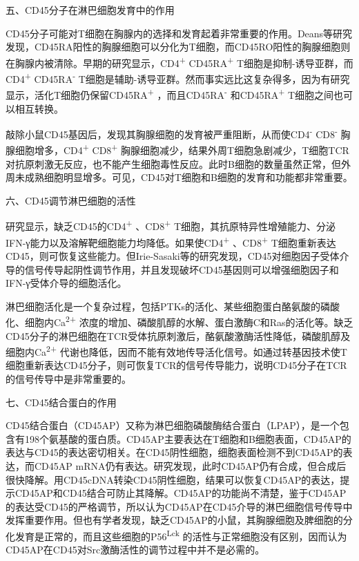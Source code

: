 \begin{center}
 {\large 五、CD45分子在淋巴细胞发育中的作用}
 \end{center}

CD45分子可能对T细胞在胸腺内的选择和发育起着非常重要的作用。Deans等研究发现，CD45RA阳性的胸腺细胞可以分化为T细胞，而CD45RO阳性的胸腺细胞则在胸腺内被清除。早期的研究显示，CD4\textsuperscript{+}
CD45RA\textsuperscript{+} T细胞是抑制-诱导亚群，而CD4\textsuperscript{+}
CD45RA\textsuperscript{-}
T细胞是辅助-诱导亚群。然而事实远比这复杂得多，因为有研究显示，活化T细胞仍保留CD45RA\textsuperscript{+}
，而且CD45RA\textsuperscript{-} 和CD45RA\textsuperscript{+}
T细胞之间也可以相互转换。

敲除小鼠CD45基因后，发现其胸腺细胞的发育被严重阻断，从而使CD4\textsuperscript{-}
CD8\textsuperscript{-} 胸腺细胞增多，CD4\textsuperscript{+}
CD8\textsuperscript{+}
胸腺细胞减少，结果外周T细胞急剧减少，T细胞TCR对抗原刺激无反应，也不能产生细胞毒性反应。此时B细胞的数量虽然正常，但外周未成熟细胞明显增多。可见，CD45对T细胞和B细胞的发育和功能都非常重要。

\begin{center}
 {\large 六、CD45调节淋巴细胞的活性}
 \end{center}

研究显示，缺乏CD45的CD4\textsuperscript{+} 、CD8\textsuperscript{+}
T细胞，其抗原特异性增殖能力、分泌IFN-γ能力以及溶解靶细胞能力均降低。如果使CD4\textsuperscript{+}
、CD8\textsuperscript{+}
T细胞重新表达CD45，则可恢复这些能力。但Irie-Sasaki等的研究发现，CD45对细胞因子受体介导的信号传导起阴性调节作用，并且发现破坏CD45基因则可以增强细胞因子和IFN-γ受体介导的细胞活化。

淋巴细胞活化是一个复杂过程，包括PTKs的活化、某些细胞蛋白酪氨酸的磷酸化、细胞内Ca\textsuperscript{2+}
浓度的增加、磷酸肌醇的水解、蛋白激酶C和Ras的活化等。缺乏CD45分子的淋巴细胞在TCR受体抗原刺激后，酪氨酸激酶活性降低，磷酸肌醇及细胞内Ca\textsuperscript{2+}
代谢也降低，因而不能有效地传导活化信号。如通过转基因技术使T细胞重新表达CD45分子，则可恢复TCR的信号传导能力，说明CD45分子在TCR的信号传导中是非常重要的。

\begin{center}
 {\large 七、CD45结合蛋白的作用}
 \end{center}

CD45结合蛋白（CD45AP）又称为淋巴细胞磷酸酶结合蛋白（LPAP），是一个包含有198个氨基酸的蛋白质。CD45AP主要表达在T细胞和B细胞表面，CD45AP的表达与CD45的表达密切相关。在CD45阴性细胞，细胞表面检测不到CD45AP的表达，而CD45AP
mRNA仍有表达。研究发现，此时CD45AP仍有合成，但合成后很快降解。用CD45cDNA转染CD45阴性细胞，结果可以恢复CD45AP的表达，提示CD45AP和CD45结合可防止其降解。CD45AP的功能尚不清楚，鉴于CD45AP的表达受CD45的严格调节，所以认为CD45AP在CD45介导的淋巴细胞信号传导中发挥重要作用。但也有学者发现，缺乏CD45AP的小鼠，其胸腺细胞及脾细胞的分化发育是正常的，而且这些细胞的P56\textsuperscript{Lck}
的活性与正常细胞没有区别，因而认为CD45AP在CD45对Src激酶活性的调节过程中并不是必需的。

